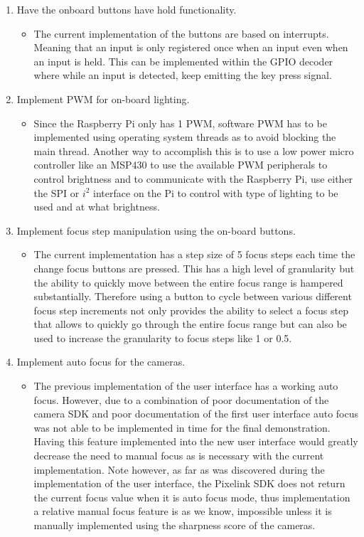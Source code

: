 \begin{enumerate}
\begin{itemize}
          \end{itemize}
	\item Have the onboard buttons have hold functionality.
          \begin{itemize}
            \item The current implementation of the buttons are based on interrupts. Meaning that an input is only registered once when an input even when an input is held. This can be implemented within the GPIO decoder where while an input is detected, keep emitting the key press signal.
          \end{itemize}
	\item Implement PWM for on-board lighting.
          \begin{itemize}
            \item Since the Raspberry Pi only has 1 PWM, software PWM has to be implemented using operating system threads as to avoid blocking the main thread. Another way to accomplish this is to use a low power micro controller like an MSP430 to use the available PWM peripherals to control brightness and to communicate with the Raspberry Pi, use either the SPI or $i^2$ interface on the Pi to control with type of lighting to be used and at what brightness.
          \end{itemize}
	\item Implement focus step manipulation using the on-board buttons.
          \begin{itemize}
            \item The current implementation has a step size of 5 focus steps each time the change focus buttons are pressed. This has a high level of granularity but the ability to quickly move between the entire focus range is hampered substantially. Therefore using a button to cycle between various different focus step increments not only provides the ability to select a focus step that allows to quickly go through the entire focus range but can also be used to increase the granularity to focus steps like 1 or 0.5.
          \end{itemize}
	\item Implement auto focus for the cameras.
          \begin{itemize}
           \item  The previous implementation of the user interface has a working auto focus. However, due to a combination of poor documentation of the camera SDK and poor documentation of the first user interface auto focus was not able to be implemented in time for the final demonstration. Having this feature implemented into the new user interface would greatly decrease the need to manual focus as is necessary with the current implementation. Note however, as far as was discovered during the implementation of the user interface, the Pixelink SDK does not return the current focus value when it is auto focus mode, thus implementation a relative manual focus feature is as we know, impossible unless it is manually implemented using the sharpness score of the cameras.

\end{itemize}
\end{enumerate}
